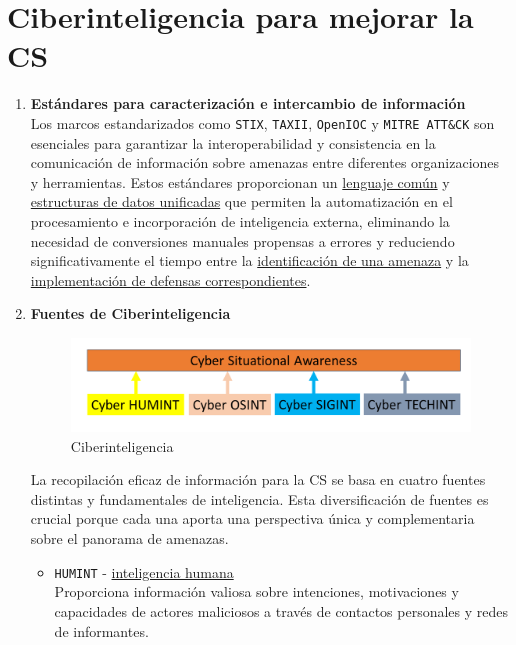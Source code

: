 \section{Ciberinteligencia para mejorar la CS}
\begin{enumerate}[resume]  %

\item \textbf{Estándares para caracterización e intercambio de información} \\
Los marcos estandarizados como \texttt{STIX}, \texttt{TAXII}, \texttt{OpenIOC} y \texttt{MITRE ATT\&CK} son esenciales para garantizar la interoperabilidad y consistencia en la comunicación de información sobre amenazas entre diferentes organizaciones y herramientas. Estos estándares proporcionan un \ul{lenguaje común} y \ul{estructuras de datos unificadas} que permiten la automatización en el procesamiento e incorporación de inteligencia externa, eliminando la necesidad de conversiones manuales propensas a errores y reduciendo significativamente el tiempo entre la \ul{identificación de una amenaza} y la \ul{implementación de defensas correspondientes}.

\item \textbf{Fuentes de Ciberinteligencia} \\
\begin{figure}[htbp]
   \centering
   \includegraphics{images/00/CS_CI.png}
   \caption{Ciberinteligencia}
   \label{fig:00/ciberinteligencia}
\end{figure}
La recopilación eficaz de información para la CS se basa en cuatro fuentes distintas y fundamentales de inteligencia.
Esta diversificación de fuentes es crucial porque cada una aporta una perspectiva única y complementaria sobre el panorama de amenazas.
\begin{itemize}
   \item \texttt{HUMINT} - \ul{inteligencia humana}\\
   Proporciona información valiosa sobre intenciones, motivaciones y capacidades de actores maliciosos a través de contactos personales y redes de informantes.
   

\end{itemize}
\end{enumerate}
